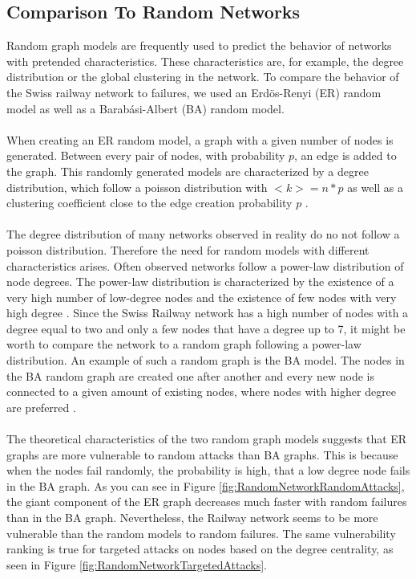 \documentclass{Resources/netsci-project}
\begin{document}
\subsection{Comparison To Random Networks}
Random graph models are frequently used to predict the behavior of networks with pretended characteristics. These characteristics are, for example, the degree distribution or the global clustering in the network. To compare the behavior of the Swiss railway network to failures, we used an Erdös-Renyi (ER) random model as well as a Barabási-Albert (BA) random model.
\\~\\
When creating an ER random model, a graph with a given number of nodes is generated. Between every pair of nodes, with probability $ p $, an edge is added to the graph. This randomly generated models are characterized by a degree distribution, which follow a poisson distribution with $ <k> = n*p $ as well as a clustering coefficient close to the edge creation probability $ p $ \autocite{Barabasi}.
\\~\\
The degree distribution of many networks observed in reality do no not follow a poisson distribution. Therefore the need for random models with different characteristics arises. Often observed networks follow a power-law distribution of node degrees. The power-law distribution is characterized by the existence of a very high number of low-degree nodes and the existence of few nodes with very high degree \autocite{Barabasi}. Since the Swiss Railway network has a high number of nodes with a degree equal to two and only a few nodes that have a degree up to 7, it might be worth to compare the network to a random graph following a power-law distribution. An example of such a random graph is the BA model. The nodes in the BA random graph are created one after another and every new node is connected to a given amount of existing nodes, where nodes with higher degree are preferred \autocite{Barabasi}. 
\\~\\
The theoretical characteristics of the two random graph models suggests that ER graphs are more vulnerable to random attacks than BA graphs. This is because when the nodes fail randomly, the probability is high, that a low degree node fails in the BA graph. As you can see in Figure \ref{fig:RandomNetworkRandomAttacks}, the giant component of the ER graph decreases much faster with random failures than in the BA graph. Nevertheless, the Railway network seems to be more vulnerable than the random models to random failures. The same vulnerability ranking is true for targeted attacks on nodes based on the degree centrality, as seen in Figure \ref{fig:RandomNetworkTargetedAttacks}.
\end{document}
